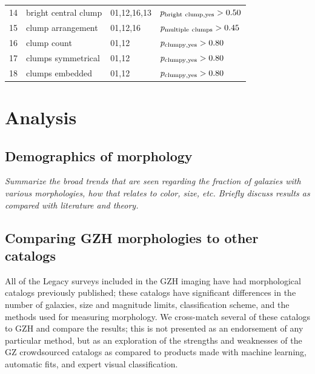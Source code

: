 \documentclass[twocolumn]{aastex6}
\begin{document}
\begin{table}
\begin{tabular}{llll}
14       & bright central clump & 01,12,16,13      & $p_{\rm bright~clump,yes}>0.50$    \\
15       & clump arrangement    & 01,12,16         & $p_{\rm multiple~clumps}>0.45$     \\
16       & clump count          & 01,12            & $p_{\rm clumpy,yes}>0.80$          \\
17       & clumps symmetrical   & 01,12            & $p_{\rm clumpy,yes}>0.80$          \\
18       & clumps embedded      & 01,12            & $p_{\rm clumpy,yes}>0.80$          \\
\hline\hline
\end{tabular}
\end{table}

\section{Analysis}\label{sec:analysis}


\subsection{Demographics of morphology}

{\note \it Summarize the broad trends that are seen regarding the fraction of galaxies with various morphologies, how that relates to color, size, etc. Briefly discuss results as compared with literature and theory.}

\subsection{Comparing GZH morphologies to other catalogs}\label{ssec:comparisons}

All of the Legacy surveys included in the GZH imaging have had morphological catalogs previously published; these catalogs have significant differences in the number of galaxies, size and magnitude limits, classification scheme, and the methods used for measuring morphology. We cross-match several of these catalogs to GZH and compare the results; this is not presented as an endorsement of any particular method, but as an exploration of the strengths and weaknesses of the GZ crowdsourced catalogs as compared to products made with machine learning, automatic fits, and expert visual classification. 
\end{document}
